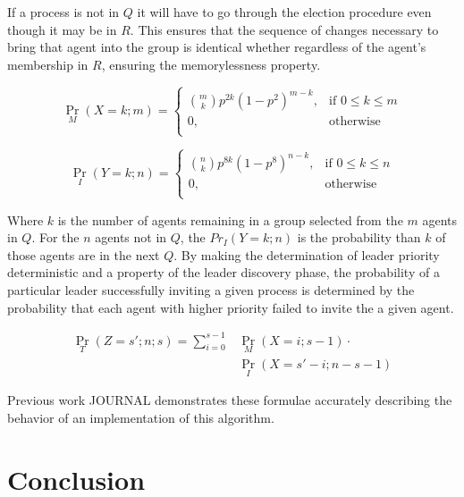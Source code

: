 If a process is not in $Q$ it will have to go through the election procedure even though it may be in $R$. This ensures that the sequence of changes necessary to bring that agent into the group is identical whether regardless of the agent's membership in $R$, ensuring the memorylessness property.


\begin{equation}
 \Pr_{M}(X=k; m) =
   \begin{cases}
    \binom{m}{k} p^{2k}(1-p^2)^{m-k}, & \text{if } 0 \leq k \leq m \\
    0,                                & \text{otherwise} \\
  \end{cases}
\end{equation}

\begin{equation}
	\Pr_{I}(Y=k; n) =
	\begin{cases}
		\binom{n}{k} p^{8k}(1-p^8)^{n-k}, & \text{if } 0 \leq k \leq n \\
		0,                                & \text{otherwise} \\
	\end{cases}
\end{equation}

Where $k$ is the number of agents remaining in a group selected from the $m$ agents in $Q$. For the $n$ agents not in $Q$, the $Pr_{I}(Y=k; n)$ is the probability than $k$ of those agents are in the next $Q$. By making the determination of leader priority deterministic and a property of the leader discovery phase, the probability of a particular leader successfully inviting a given process is determined by the probability that each agent with higher priority failed to invite the a given agent.

\begin{align} \Pr_{T}(Z=s'; n; s) = \sum_{i=0}^{s-1} &\Pr_{M}(X=i; s-1) \cdot
\nonumber \\ &\Pr_{I}(X=s'-i; n-s-1) \end{align}

Previous work JOURNAL demonstrates these formulae accurately describing the behavior of an implementation of this algorithm.

\section{Conclusion}

